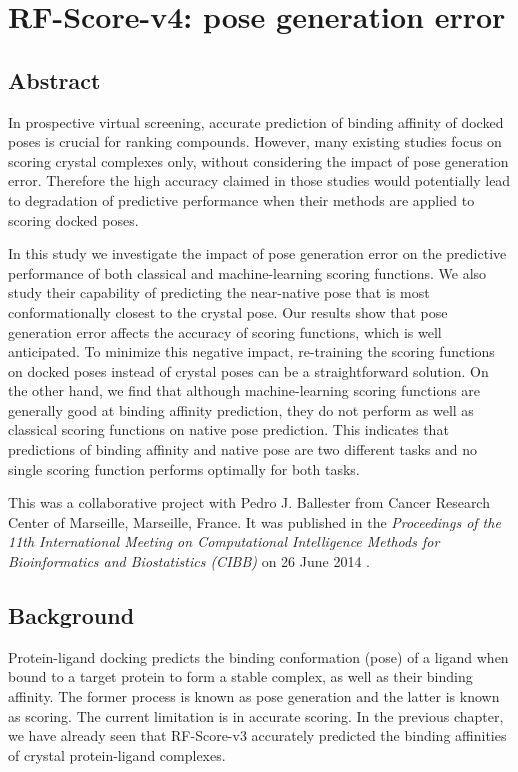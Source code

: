 \chapter{RF-Score-v4: pose generation error}
\label{rfscore4}

\section{Abstract}

In prospective virtual screening, accurate prediction of binding affinity of docked poses is crucial for ranking compounds. However, many existing studies focus on scoring crystal complexes only, without considering the impact of pose generation error. Therefore the high accuracy claimed in those studies would potentially lead to degradation of predictive performance when their methods are applied to scoring docked poses.

In this study we investigate the impact of pose generation error on the predictive performance of both classical and machine-learning scoring functions. We also study their capability of predicting the near-native pose that is most conformationally closest to the crystal pose. Our results show that pose generation error affects the accuracy of scoring functions, which is well anticipated. To minimize this negative impact, re-training the scoring functions on docked poses instead of crystal poses can be a straightforward solution. On the other hand, we find that although machine-learning scoring functions are generally good at binding affinity prediction, they do not perform as well as classical scoring functions on native pose prediction. This indicates that predictions of binding affinity and native pose are two different tasks and no single scoring function performs optimally for both tasks.

This was a collaborative project with Pedro J. Ballester from Cancer Research Center of Marseille, Marseille, France. It was published in the \textit{Proceedings of the 11th International Meeting on Computational Intelligence Methods for Bioinformatics and Biostatistics (CIBB)} on 26 June 2014 \citep{1434}.

\section{Background}

Protein-ligand docking predicts the binding conformation (pose) of a ligand when bound to a target protein to form a stable complex, as well as their binding affinity. The former process is known as pose generation and the latter is known as scoring. The current limitation is in accurate scoring. In the previous chapter, we have already seen that RF-Score-v3 accurately predicted the binding affinities of crystal protein-ligand complexes.

